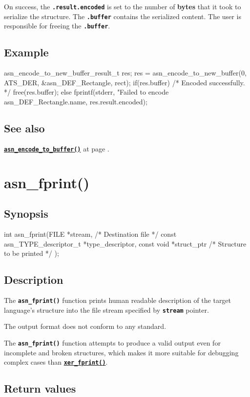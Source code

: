 \documentclass[english,oneside,12pt]{book}
\newcommand{\apisection}[2]{\clearpage\section{\label{#1}#2}}
\newcommand{\api}[2]{\hyperref[#1]{\code{#2}}}
\newcommand{\seealso}[2]{\api{#1}{#2} at page \pageref{#1}}
\newcommand{\code}[1]{\texttt{\textbf{\lstinline{#1}}}}
\begin{document}
\noindent{}On success, the \code{.result.encoded} is set to the number of
\textbf{bytes} that it took to serialize the structure.
The \code{.buffer} contains the serialized content.
The user is responsible for freeing the \code{.buffer}.

\subsection*{Example}
\begin{example}
asn_encode_to_new_buffer_result_t res;
res = asn_encode_to_new_buffer(0, ATS_DER, &asn_DEF_Rectangle, rect);
if(res.buffer) {
    /* Encoded successfully. */
    free(res.buffer);
} else {
    fprintf(stderr, "Failed to encode %
        asn_DEF_Rectangle.name, res.result.encoded);
}
\end{example}

\subsection*{See also}
\seealso{sec:asn_encode_to_buffer}{asn_encode_to_buffer()}.

\apisection{sec:asn_fprint}{asn\_fprint()}

\subsection*{Synopsis}
\begin{signature}
int asn_fprint(FILE *stream,    /* Destination file */
    const asn_TYPE_descriptor_t *type_descriptor,
    const void *struct_ptr      /* Structure to be printed */
);
\end{signature}

\subsection*{Description}

The \code{asn_fprint()} function prints human readable description
of the target language's structure into the file stream specified by
\code{stream} pointer.

The output format does not conform to any standard.

The \code{asn_fprint()} function attempts to
produce a valid output even for incomplete and broken structures, which
makes it more suitable for debugging complex cases than
\api{sec:xer_fprint}{xer_fprint()}.

\subsection*{Return values}
\end{document}
